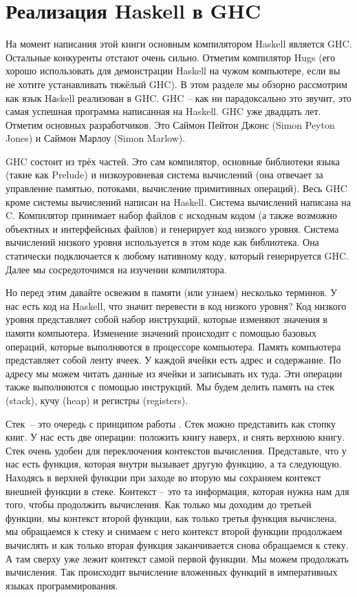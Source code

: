 \setcounter{chapter}{9}
\chapter{Реализация Haskell в GHC}

На момент написания этой книги основным компилятором
Haskell является GHC. Остальные конкуренты отстают очень
сильно. Отметим компилятор Hugs (его хорошо использовать 
для демонстрации Haskell на чужом компьютере, если вы не хотите
устанавливать тяжёлый GHC).
В этом разделе мы обзорно рассмотрим как язык Hаskell 
реализован в GHC. 
GHC -- как ни парадоксально это звучит, это самая успешная
программа написанная на Haskell. GHC уже двадцать лет.
Отметим основных разработчиков. Это Саймон Пейтон Джонс
(Simon Peyton Jones) и Саймон Марлоу (Simon Marlow).

GHC состоит из трёх частей. Это сам компилятор, основные
библиотеки языка (такие как Prelude) и низкоуровневая 
система вычислений (она отвечает за управление памятью, 
потоками, вычисление примитивных операций). 
Весь GHC кроме системы вычислений
написан на Haskell. Система вычислений написана на C.
Компилятор принимает набор файлов с исходным кодом 
(а также возможно объектных и интерфейсных файлов) 
и генерирует код низкого уровня. Система вычислений низкого уровня
используется в этом коде как библиотека. Она статически 
подключается к любому нативному коду, который генерируется GHC. 
Далее мы сосредоточимся на изучении компилятора. 

Но перед этим давайте освежим в памяти (или узнаем)
несколько терминов. У нас есть код на Haskell, что значит
перевести в код низкого уровня? Код низкого уровня представляет
собой набор инструкций, которые изменяют значения в памяти
компьютера. Изменение значений происходит с помощью 
базовых операций, которые выполняются в процессоре компьютера.
Память компьютера представляет собой ленту ячеек. У каждой
ячейки есть адрес и содержание. По адресу мы можем читать
данные из ячейки и записывать их туда. Эти операции также
выполняются с помощью инструкций. 
Мы будем делить память на стек (stack), кучу (heap) и 
регистры (registers). 

Стек~-- это очередь с 
принципом работы .
Стек можно представить как стопку книг. У нас есть две
операции: положить книгу наверх, и снять верхнюю книгу.
Стек очень удобен для переключения контекстов вычисления.
Представьте, что у нас есть функция, которая внутри 
вызывает другую функцию, а та следующую. Находясь в 
верхней функции при заходе во вторую мы сохраняем контекст
внешней функции в стеке. Контекст -- это та информация, которая
нужна нам для того, чтобы продолжить вычисления. 
Как только мы доходим до третьей функции, мы  контекст второй функции, как только третья функция вычислена,
мы обращаемся к стеку и снимаем с него контекст второй функции
продолжаем вычислять и как только вторая функция заканчивается
снова обращаемся к стеку. А там сверху уже лежит контекст 
самой первой функции. Мы можем продолжать вычисления. Так 
происходит вычисление вложенных функций в императивных 
языках программирования. 

